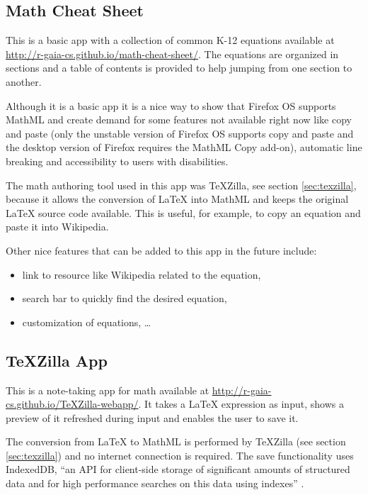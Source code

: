 \subsection{Math Cheat Sheet}

This is a basic app with a collection of common K-12 equations available at
\href{http://r-gaia-cs.github.io/math-cheat-sheet/}{http://r-gaia-cs.github.io/math-cheat-sheet/}.
The equations are organized in sections and a table of contents is provided to
help jumping from one section to another.

Although it is a basic app it is a nice way to show that Firefox OS supports
MathML and create demand for some features not available right now like copy and
paste (only the unstable version of Firefox OS supports copy and paste and the
desktop version of Firefox requires the MathML Copy add-on),
automatic line breaking and accessibility to users with disabilities.

The math authoring tool used in this app was TeXZilla, see section
\ref{sec:texzilla}, because it allows the conversion of LaTeX into MathML and
keeps the original LaTeX source code available.
This is useful, for example, to copy an equation
and paste it into Wikipedia.

Other nice features that can be added to this app in the future include:
\begin{itemize}
  \item link to resource like Wikipedia related to the equation,
  \item search bar to quickly find the desired equation,
  \item customization of equations, \ldots
\end{itemize}

\subsection{TeXZilla App}
\label{sec:texzillapp}

This is a note-taking app for math available at
\href{http://r-gaia-cs.github.io/TeXZilla-webapp/}{http://r-gaia-cs.github.io/TeXZilla-webapp/}.
It takes a LaTeX expression as input, shows a preview of it refreshed during
input and enables the user to save it.

The conversion from LaTeX to MathML is performed by TeXZilla
(see section \ref{sec:texzilla})
and no internet connection is required. The save functionality
uses IndexedDB, ``an API for client-side storage of significant amounts of
structured data and for high performance searches on this data using indexes''
 \cite{IndexedDatabaseAPI}.

